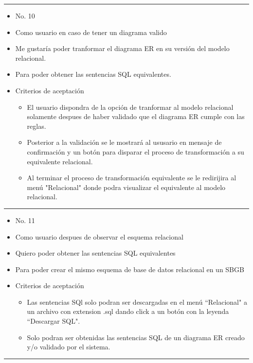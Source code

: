 \noindent\rule{\textwidth}{1pt}
\begin{itemize}
	\item No. 10
	\item Como usuario en caso de tener un diagrama valido
	\item Me gustaría poder tranformar el diagrama ER en su versión del modelo relacional.
	\item Para poder obtener las sentencias SQL equivalentes.
	\item Criterios de aceptación
	\begin{itemize}
		\item El usuario dispondra de la opción de tranformar al modelo relacional solamente despues de haber validado que el diagrama ER cumple con las reglas.
		\item Posterior a la validación se le mostrará al ususario en mensaje de confirmación y un botón para disparar el proceso de transformación a su equivalente relacional.
		\item Al terminar el proceso de transformación equivalente se le redirijira al menú "Relacional" donde podra visualizar el equivalente al modelo relacional.
	\end{itemize}
\end{itemize}
\noindent\rule{\textwidth}{1pt}
\begin{itemize}
	\item No. 11
	\item Como usuario despues de observar el esquema relacional
	\item Quiero poder obtener las sentencias SQL equivalentes
	\item Para poder crear el mismo esquema de base de datos relacional en un SBGB
	\item Criterios de aceptación
	\begin{itemize}
		\item Las sentencias SQl solo podran ser descargadas en el menú ``Relacional" a un archivo con extension .sql dando click a un botón con la leyenda ``Descargar SQL".
		\item Solo podran ser obtenidas las sentencias SQL de un diagrama ER creado y/o validado por el sistema.
	\end{itemize}
\end{itemize}
\noindent\rule{\textwidth}{1pt}

